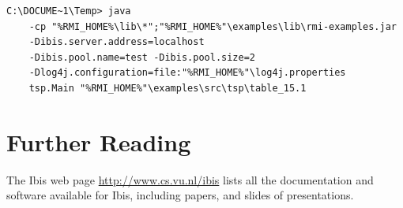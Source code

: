 \documentclass[a4paper,10pt]{article}
\begin{document}
\noindent
{\small
\begin{verbatim}
C:\DOCUME~1\Temp> java
    -cp "%RMI_HOME%\lib\*";"%RMI_HOME%"\examples\lib\rmi-examples.jar
    -Dibis.server.address=localhost
    -Dibis.pool.name=test -Dibis.pool.size=2
    -Dlog4j.configuration=file:"%RMI_HOME%"\log4j.properties
    tsp.Main "%RMI_HOME%"\examples\src\tsp\table_15.1
\end{verbatim}
}
\noindent

\section{Further Reading}

The Ibis web page \url{http://www.cs.vu.nl/ibis} lists all
the documentation and software available for Ibis, including papers, and
slides of presentations.
\end{document}
